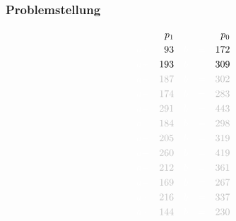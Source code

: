 \documentclass{beamer}
\begin{document}
\begin{frame}
    \frametitle{Problemstellung}
    \small
    \begin{alignat*}{5}
           && p_1 &&     && && p_0 \\
        {\color{white}a +}&&                     93 &&   {\color{white}b} &&{\color{white}=}&&                    172 \\
        {\color{white}a +}&&                    193 &&   {\color{white}b} &&{\color{white}=}&&                    309 \\
        {\color{white}a +}&& {\color{lightgray}187} &&   {\color{white}b} &&{\color{white}=}&& {\color{lightgray}302} \\
        {\color{white}a +}&& {\color{lightgray}174} &&   {\color{white}b} &&{\color{white}=}&& {\color{lightgray}283} \\
        {\color{white}a +}&& {\color{lightgray}291} &&   {\color{white}b} &&{\color{white}=}&& {\color{lightgray}443} \\
        {\color{white}a +}&& {\color{lightgray}184} &&   {\color{white}b} &&{\color{white}=}&& {\color{lightgray}298} \\
        {\color{white}a +}&& {\color{lightgray}205} &&   {\color{white}b} &&{\color{white}=}&& {\color{lightgray}319} \\
        {\color{white}a +}&& {\color{lightgray}260} &&   {\color{white}b} &&{\color{white}=}&& {\color{lightgray}419} \\
        {\color{white}a +}&& {\color{lightgray}212} &&   {\color{white}b} &&{\color{white}=}&& {\color{lightgray}361} \\
        {\color{white}a +}&& {\color{lightgray}169} &&   {\color{white}b} &&{\color{white}=}&& {\color{lightgray}267} \\
        {\color{white}a +}&& {\color{lightgray}216} &&   {\color{white}b} &&{\color{white}=}&& {\color{lightgray}337} \\
        {\color{white}a +}&& {\color{lightgray}144} &&   {\color{white}b} &&{\color{white}=}&& {\color{lightgray}230}
    \end{alignat*}
\end{frame}
\end{document}
